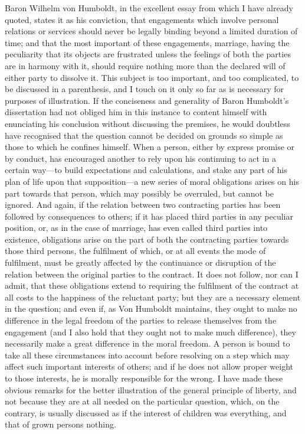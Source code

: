\documentclass[11pt,openany]{book}
\begin{document}
Baron Wilhelm von Humboldt, in the excellent essay from which I have already quoted, states it as his conviction, that engagements which involve personal relations or services should never be legally binding beyond a limited duration of time; and that the most important of these engagements, marriage, having the peculiarity that its objects are frustrated unless the feelings of both the parties are in harmony with it, should require nothing more than the declared will of either party to dissolve it. This subject is too important, and too complicated, to be discussed in a parenthesis, and I touch on it only so far as is necessary for purposes of illustration. If the conciseness and generality of Baron Humboldt's dissertation had not obliged him in this instance to content himself with enunciating his conclusion without discussing the premises, he would doubtless have recognised that the question cannot be decided on grounds so simple as those to which he confines himself. When a person, either by express promise or by conduct, has encouraged another to rely upon his continuing to act in a certain way---to build expectations and calculations, and stake any part of his plan of life upon that supposition---a new series of moral obligations arises on his part towards that person, which may possibly be overruled, but cannot be ignored. And again, if the relation between two contracting parties has been followed by consequences to others; if it has placed third parties in any peculiar position, or, as in the case of marriage, has even called third parties into existence, obligations arise on the part of both the contracting parties towards those third persons, the fulfilment of which, or at all events the mode of fulfilment, must be greatly affected by the continuance or disruption of the relation between the original parties to the contract. It does not follow, nor can I admit, that these obligations extend to requiring the fulfilment of the contract at all costs to the happiness of the reluctant party; but they are a necessary element in the question; and even if, as Von Humboldt maintains, they ought to make no difference in the legal freedom of the parties to release themselves from the engagement (and I also hold that they ought not to make much difference), they necessarily make a great difference in the moral freedom. A person is bound to take all these circumstances into account before resolving on a step which may affect such important interests of others; and if he does not allow proper weight to those interests, he is morally responsible for the wrong. I have made these obvious remarks for the better illustration of the general principle of liberty, and not because they are at all needed on the particular question, which, on the contrary, is usually discussed as if the interest of children was everything, and that of grown persons nothing.
\end{document}

